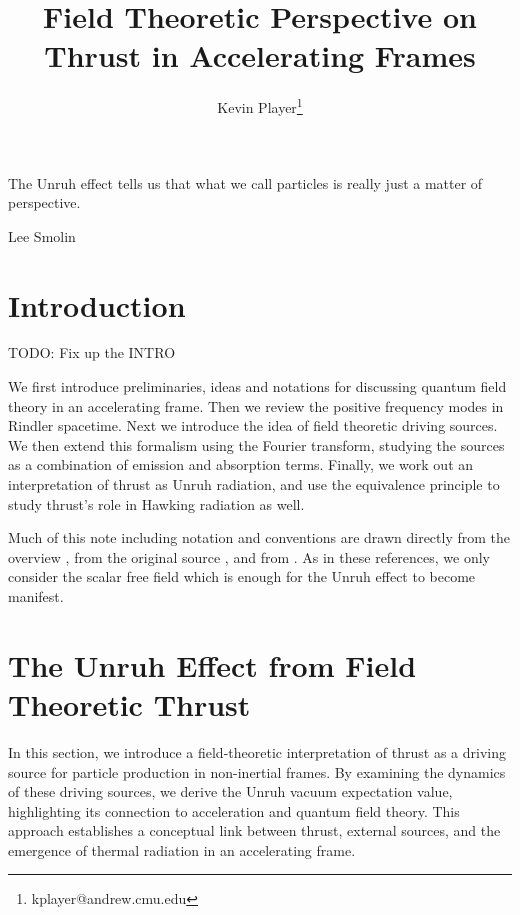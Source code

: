 \documentclass[12pt,a4paper]{article}
\begin{document}
\title{Field Theoretic Perspective on Thrust in Accelerating Frames}
\author[1]{Kevin Player\footnote{kplayer@andrew.cmu.edu}}

\maketitle

\epigraph{The Unruh effect tells us that what we call particles is really just a matter of perspective.}{Lee Smolin}



\section{Introduction}

TODO: Fix up the INTRO

We first introduce preliminaries, ideas and notations for discussing quantum field theory in an accelerating frame.  Then we review the positive frequency modes in Rindler spacetime.  Next we introduce the idea of field theoretic driving sources.  We then extend this formalism using the Fourier transform, studying the sources as a combination of emission and absorption terms.  Finally, we work out an interpretation of thrust as Unruh radiation, and use the equivalence principle to study thrust's role in Hawking radiation as well.

Much of this note including notation and conventions are drawn directly from the overview \cite{Frodden}, from the original source \cite{unruh}, and from \cite{beisert}.  As in these references, we only consider the scalar free field which is enough for the Unruh effect to become manifest.

\section{The Unruh Effect from Field Theoretic Thrust}
In this section, we introduce a field-theoretic interpretation of thrust as a driving source for particle production in non-inertial frames. By examining the dynamics of these driving sources, we derive the Unruh vacuum expectation value, highlighting its connection to acceleration and quantum field theory. This approach establishes a conceptual link between thrust, external sources, and the emergence of thermal radiation in an accelerating frame.
\end{document}
